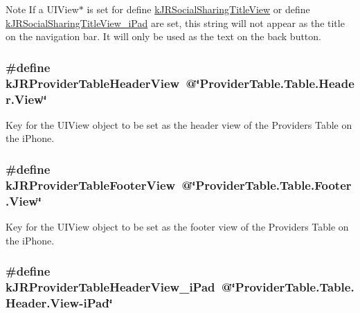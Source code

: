\begin{DoxyNote}{Note}
If a UIView$\ast$ is set for define \hyperlink{group__custom_interface_ga524965cf426f0eb9de4bcb804528c7f7}{kJRSocialSharingTitleView} or define \hyperlink{group__custom_interface_ga2f88062cdd1fd38ad0e800d382450398}{kJRSocialSharingTitleView\_\-iPad} are set, this string will not appear as the title on the navigation bar. It will only be used as the text on the back button. 
\end{DoxyNote}
\hypertarget{group__custom_interface_ga1a0f39bfdb880fdd0b8b39cbec492b6f}{
\subsubsection[{kJRProviderTableHeaderView}]{\setlength{\rightskip}{0pt plus 5cm}\#define kJRProviderTableHeaderView~@\char`\"{}ProviderTable.Table.Header.View\char`\"{}}}
\label{group__custom_interface_ga1a0f39bfdb880fdd0b8b39cbec492b6f}
Key for the {\ttfamily UIView} object to be set as the header view of the Providers Table on the iPhone. \hypertarget{group__custom_interface_ga2b5c9162dd7701a552147ae1607a3b4d}{
\subsubsection[{kJRProviderTableFooterView}]{\setlength{\rightskip}{0pt plus 5cm}\#define kJRProviderTableFooterView~@\char`\"{}ProviderTable.Table.Footer.View\char`\"{}}}
\label{group__custom_interface_ga2b5c9162dd7701a552147ae1607a3b4d}
Key for the {\ttfamily UIView} object to be set as the footer view of the Providers Table on the iPhone. \hypertarget{group__custom_interface_gafaf90a1aa537b105ebc2409ceacc652f}{
\subsubsection[{kJRProviderTableHeaderView\_\-iPad}]{\setlength{\rightskip}{0pt plus 5cm}\#define kJRProviderTableHeaderView\_\-iPad~@\char`\"{}ProviderTable.Table.Header.View-\/iPad\char`\"{}}}
